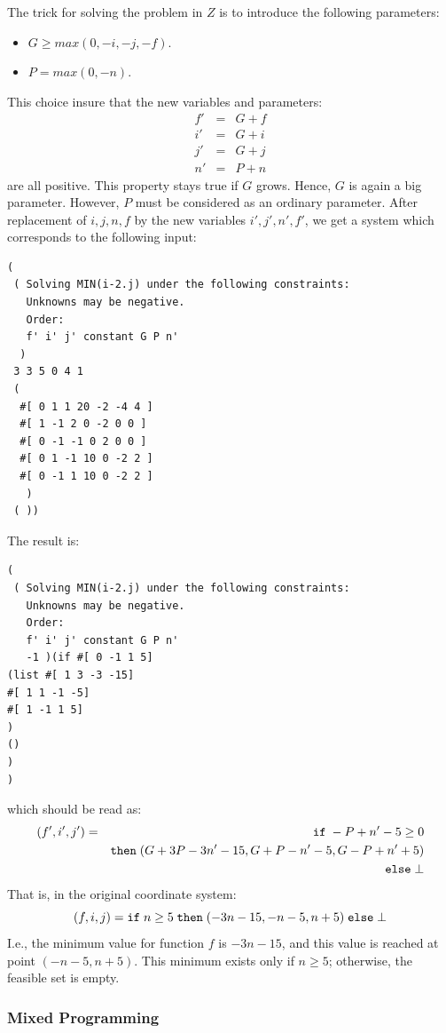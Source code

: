 \documentclass[12pt,a4paper]{article}
\begin{document}
The trick for solving the problem in $Z$ is to introduce the following
parameters:
\begin{itemize}
\item $G \ge max(0, -i, -j, -f)$.
\item $P = max(0, -n)$.
\end{itemize}
This choice insure that the new variables and parameters:
\begin{eqnarray*}
f' &=& G + f \\
i' &=& G + i \\
j' &=& G + j \\
n' &=& P + n
\end{eqnarray*}
are all positive. This property stays true if $G$ grows. Hence, $G$
is again a big parameter. However, $P$ must be considered as an ordinary
parameter. After replacement of $i,j,n, f$ by the new variables
$i',j',n',f'$, we get a system which corresponds to the following input:

\begin{verbatim}
( 
 ( Solving MIN(i-2.j) under the following constraints:
   Unknowns may be negative.
   Order:
   f' i' j' constant G P n'
  )
 3 3 5 0 4 1
 ( 
  #[ 0 1 1 20 -2 -4 4 ]
  #[ 1 -1 2 0 -2 0 0 ]
  #[ 0 -1 -1 0 2 0 0 ]
  #[ 0 1 -1 10 0 -2 2 ]
  #[ 0 -1 1 10 0 -2 2 ]
   )
 ( ))
\end{verbatim}

The result is:
\begin{verbatim}
( 
 ( Solving MIN(i-2.j) under the following constraints:
   Unknowns may be negative.
   Order:
   f' i' j' constant G P n'
   -1 )(if #[ 0 -1 1 5]
(list #[ 1 3 -3 -15]
#[ 1 1 -1 -5]
#[ 1 -1 1 5]
)
()
)
)
\end{verbatim}
which should be read as:
\begin{eqnarray*}
 (f',i',j') & = & {\tt if}\;  -P+n'-5 \geq 0 \\
            &   & {\tt then} \; (G+3P-3n'-15, G+P-n'-5,G-P+n'+5) \\
            &   & {\tt else} \; \bot
\end{eqnarray*}
That is, in the original coordinate system:
\[ (f,i,j) = {\tt if}\;  n \geq 5 \; {\tt then} \; (-3n-15, -n-5, n+5)
 \; {\tt else} \; \bot \]
I.e., the minimum value for function $f$ is $-3n-15$, and this value
is reached at point $(-n-5, n+5)$. This minimum exists only if $n \ge 5$;
otherwise, the feasible set is empty.

\subsubsection{Mixed Programming}
\end{document}
